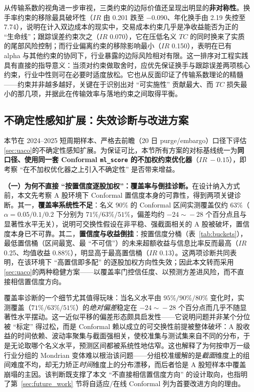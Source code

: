 从传输系数的视角进一步审视，三类约束的边际价值还呈现出明显的\textbf{非对称性}。换手率约束的移除最具破坏性（$IR$ 由 0.201 跌至 $-0.090$、年化换手由 2.19 失控至 7.74），说明在计入双边成本的现实中，交易成本约束几乎是净收益能否为正的 ``生命线''；跟踪误差约束次之（$IR$ 0.070），它在压低名义 $TC$ 的同时换来了实质的尾部风险控制；而行业偏离约束的移除影响最小（$IR$ 0.150），表明在已有 alpha 与其他约束的协同下，行业暴露的边际风险相对有限。这一排序对工程实践具有直接的指导意义：当须对约束做取舍时，应优先保证换手与跟踪误差两项核心约束，行业中性则可在必要时适度放松。它也从反面印证了传输系数理论的精髓——约束并非越多越好，关键在于识别出对 ``可实施性'' 贡献最大、而 $TC$ 损失最小的那几项，并据此在传输效率与落地约束之间取得平衡。

\subsection{不确定性感知扩展：失效诊断与改进方案}
\label{subsec:uncertainty}
本节在 2024--2025 短周期样本、严格去前瞻（20 日 purge/embargo）口径下评估\ref{sec:uaco}的不确定性感知扩展。为保证可比，本节所有方案的对标基线统一为\textbf{同口径、使用同一套 Conformal \texttt{ml\_score} 的不加权约束优化器}（$IR\ -0.15$），即考察 ``在不加权优化器之上引入不确定性'' 是否带来增益。

\textbf{（一）为何不直接 ``按置信度逐股加权''：覆盖率与倒挂诊断。}在设计纳入方式前，本文先考察 A 股环境下 Conformal 置信度本身的可靠性，得到两项关键诊断。其一，\textbf{覆盖率系统性不足}：名义 $90\%$ 的 Conformal 区间实测覆盖仅约 $63\%$（$\alpha=0.05/0.1/0.2$ 下分别为 $71\%/63\%/51\%$，偏差均约 $-24\!\sim\!-28$ 个百分点且与显著性水平无关），说明可交换性假设在非平稳、强截面相关的 A 股被破坏，置信度本身已不可靠。其二，\textbf{置信度与收益倒挂}：按置信度分桶（表~\ref{tab:buckets}），最低置信桶（区间最宽、最 ``不可信''）的未来超额收益与信息比率反而最高（$IR$ 0.25、均值收益 $0.88\%$），明显高于最高置信桶（$IR$ 0.13）。这两项诊断共同表明，在该环境下 ``高置信即多配'' 的逐股加权方向性失效；因此本文转而采用\ref{sec:uaco}的两种稳健方案——以覆盖率门控信任度、以预测方差进风险，而不直接相信置信度方向。

覆盖率诊断的一个细节尤其值得玩味：当名义水平由 $95\%/90\%/80\%$ 变化时，实测覆盖（$71\%/63\%/51\%$）的\emph{绝对偏差}稳定在 $-24\!\sim\!-28$ 个百分点而几乎不随显著性水平摆动。这一近似平移的偏差形态颇具启发性——它说明问题并非某个分位被 ``标定'' 得过松，而是 Conformal 赖以成立的可交换性前提被整体破坏：A 股收益的时间依赖、波动率聚集与截面强相关，使校准集与测试集来自不同的分布，于是无论取哪个名义水平，预测区间都被系统性地估窄。这也解释了为何按申万一级行业分组的 Mondrian 变体难以根治该问题——分组校准缓解的是\emph{截面}维度上的组间难度不均，却无力矫正\emph{时间}维度上的分布漂移，而后者恰是 A 股短样本中覆盖崩塌的主因。该判断既支撑了本文 ``不直接相信置信度方向'' 的设计取向，也指明了第~\ref{sec:future_work} 节将自适应/在线 Conformal 列为首要改进方向的理由。

